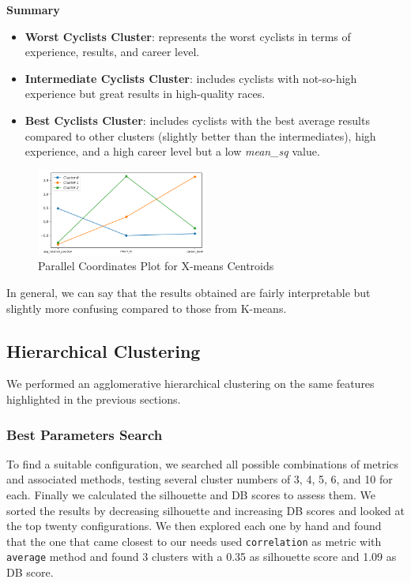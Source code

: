 \noindent
\textbf{Summary}
\begin{itemize}
    \item \textbf{Worst Cyclists Cluster}: represents the worst cyclists in terms of experience, results, and career level.
    \item \textbf{Intermediate Cyclists Cluster}: includes cyclists with not-so-high experience but great results in high-quality races.
    \item \textbf{Best Cyclists Cluster}: includes cyclists with the best average results compared to other clusters (slightly better than the intermediates), high experience, and a high career level but a low \textit{mean\_sq} value.
\end{itemize}

\begin{figure}[H]
\centering
\includegraphics[width=0.5\textwidth]{images/CLUSTER/X-means/centroids_plot.png}
\caption{ \small \small Parallel Coordinates Plot for X-means Centroids}
\label{fig:cluster_centroids_xmeans}
\end{figure}

\noindent
In general, we can say that the results obtained are fairly interpretable but slightly more confusing compared to those from K-means.

\subsection{Hierarchical Clustering}
We performed an agglomerative hierarchical clustering on the same features highlighted in the previous sections. \\

\subsubsection{Best Parameters Search}
To find a suitable configuration, we searched all possible combinations of metrics and associated methods, testing several cluster numbers of 3, 4, 5, 6, and 10 for each. Finally we calculated the silhouette and DB scores to assess them. We sorted the results by decreasing silhouette and increasing DB scores and looked at the top twenty configurations. We then explored each one by hand and found that the one that came closest to our needs used \texttt{correlation} as metric with \texttt{average} method and found 3 clusters with a 0.35 as silhouette score and 1.09 as DB score. \\

